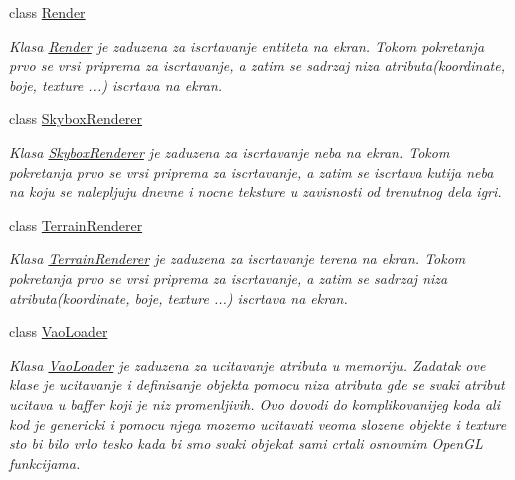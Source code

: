 \begin{DoxyCompactItemize}
class \hyperlink{classcore_1_1Render}{Render}
\begin{DoxyCompactList}\small\item\em Klasa \hyperlink{classcore_1_1Render}{Render} je zaduzena za iscrtavanje entiteta na ekran. Tokom pokretanja prvo se vrsi priprema za iscrtavanje, a zatim se sadrzaj niza atributa(koordinate, boje, texture ...) iscrtava na ekran. \end{DoxyCompactList}\item 
class \hyperlink{classcore_1_1SkyboxRenderer}{Skybox\+Renderer}
\begin{DoxyCompactList}\small\item\em Klasa \hyperlink{classcore_1_1SkyboxRenderer}{Skybox\+Renderer} je zaduzena za iscrtavanje neba na ekran. Tokom pokretanja prvo se vrsi priprema za iscrtavanje, a zatim se iscrtava kutija neba na koju se nalepljuju dnevne i nocne teksture u zavisnosti od trenutnog dela igri. \end{DoxyCompactList}\item 
class \hyperlink{classcore_1_1TerrainRenderer}{Terrain\+Renderer}
\begin{DoxyCompactList}\small\item\em Klasa \hyperlink{classcore_1_1TerrainRenderer}{Terrain\+Renderer} je zaduzena za iscrtavanje terena na ekran. Tokom pokretanja prvo se vrsi priprema za iscrtavanje, a zatim se sadrzaj niza atributa(koordinate, boje, texture ...) iscrtava na ekran. \end{DoxyCompactList}\item 
class \hyperlink{classcore_1_1VaoLoader}{Vao\+Loader}
\begin{DoxyCompactList}\small\item\em Klasa \hyperlink{classcore_1_1VaoLoader}{Vao\+Loader} je zaduzena za ucitavanje atributa u memoriju. Zadatak ove klase je ucitavanje i definisanje objekta pomocu niza atributa gde se svaki atribut ucitava u baffer koji je niz promenljivih. Ovo dovodi do komplikovanijeg koda ali kod je genericki i pomocu njega mozemo ucitavati veoma slozene objekte i texture sto bi bilo vrlo tesko kada bi smo svaki objekat sami crtali osnovnim Open\+GL funkcijama. \end{DoxyCompactList}\end{DoxyCompactItemize}
